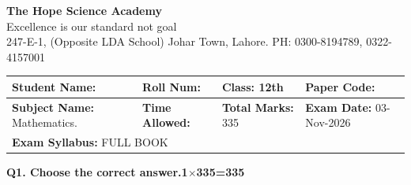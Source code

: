 \documentclass[11pt,a4paper]{article}
\begin{document}
\begin{center}
  {\Huge\bfseries The Hope Science Academy}\\[3pt]
  {\small Excellence is our standard not goal}\\[2pt]
  {\small 247-E-1, (Opposite LDA School) Johar Town, Lahore. PH: 0300-8194789, 0322-4157001}
\end{center}

\medskip
\noindent
\begin{tabularx}{\linewidth}{|X|X|X|X|}
\hline
\textbf{Student Name:} & \textbf{Roll Num:} & \textbf{Class:} 12th & \textbf{Paper Code:} \\ \hline
\textbf{Subject Name:} Mathematics. & \textbf{Time Allowed:} & \textbf{Total Marks:} 335 & \textbf{Exam Date:} 03-Nov-2026 \\ \hline
\multicolumn{4}{|l|}{\textbf{Exam Syllabus:} FULL BOOK} \\ \hline
\end{tabularx}

\bigskip
\noindent\textbf{Q1. Choose the correct answer.}\hfill\textbf{1$\times$335=335}
\end{document}
